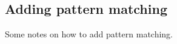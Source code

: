 \if {}
\subsection{Adding pattern matching} \label{secAddPatternMatching}

Some notes on how to add pattern matching.
\fi

% 
% 

